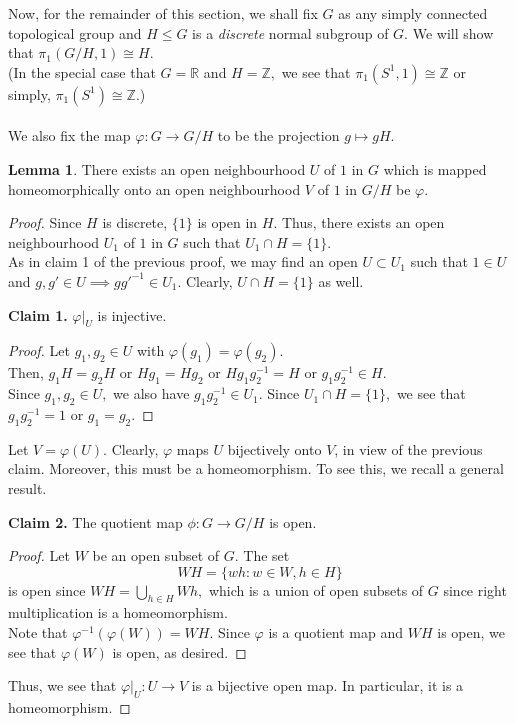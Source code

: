 \documentclass[12pt]{article}
\theoremstyle{definition}
\numberwithin{thm}{section}
\newtheorem{lem}[thm]{Lemma}
\newenvironment{blockquote}
{\begin{mdframed}[skipabove=0pt, skipbelow=0pt, innertopmargin=4pt, innerbottommargin=4pt, bottomline=false,topline=false,rightline=false, linewidth=2pt]}
{\end{mdframed}}
\begin{document}
Now, for the remainder of this section, we shall fix $G$ as any simply connected topological group and $H \le G$ is a \emph{discrete} normal subgroup of $G.$ We will show that $\pi_1(G/H, 1) \cong H.$\\
(In the special case that $G = \mathbb{R}$ and $H = \mathbb{Z},$ we see that $\pi_1(S^1, 1) \cong \mathbb{Z}$ or simply, $\pi_1(S^1) \cong \mathbb{Z}.$)\\~\\
We also fix the map $\varphi:G \to G/H$ to be the projection $g \mapsto gH.$\\
\begin{lem} 
	There exists an open neighbourhood $U$ of $1$ in $G$ which is mapped homeomorphically onto an open neighbourhood $V$ of $1$ in $G/H$ be $\varphi.$
\end{lem}
\begin{proof} 
	Since $H$ is discrete, $\{1\}$ is open in $H.$ Thus, there exists an open neighbourhood $U_1$ of $1$ in $G$ such that $U_1 \cap H = \{1\}.$\\
	As in claim 1 of the previous proof, we may find an open $U \subset U_1$ such that $1 \in U$ and $g, g' \in U \implies gg'^{-1} \in U_1.$ Clearly, $U \cap H =\{1\}$ as well. \\
	\begin{blockquote}
		\textbf{Claim 1.} $\varphi|_U$ is injective.
	\begin{proof} 
		Let $g_1, g_2 \in U$ with $\varphi(g_1) = \varphi(g_2).$\\
		Then, $g_1H = g_2H$ or $Hg_1 = Hg_2$ or $Hg_1g_2^{-1} = H$ or $g_1g_2^{-1} \in H.$\\
		Since $g_1, g_2 \in U,$ we also have $g_1g_2^{-1} \in U_1.$ Since $U_1 \cap H = \{1\},$ we see that $g_1g_2^{-1} = 1$ or $g_1 = g_2.$
	\end{proof}
	\end{blockquote}
	Let $V = \varphi(U).$ Clearly, $\varphi$ maps $U$ bijectively onto $V$, in view of the previous claim. Moreover, this must be a homeomorphism. To see this, we recall a general result.
	\begin{blockquote}
		\textbf{Claim 2.} The quotient map $\phi:G \to G/H$ is open.
	\begin{proof} 
		Let $W$ be an open subset of $G.$ The set
		\begin{equation*} 
			WH = \{wh : w \in W, h \in H\}
		\end{equation*}
		is open since $WH = \displaystyle\bigcup_{h \in H}Wh,$ which is a union of open subsets of $G$ since right multiplication is a homeomorphism.\\
		Note that $\varphi^{-1}(\varphi(W)) = WH.$ Since $\varphi$ is a quotient map and $WH$ is open, we see that $\varphi(W)$ is open, as desired.
	\end{proof}
	\end{blockquote}
	Thus, we see that $\varphi|_U: U \to V$ is a bijective open map. In particular, it is a homeomorphism.
\end{proof}
\end{document}
